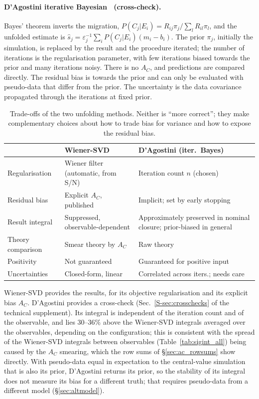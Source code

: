 \documentclass[11pt,a4paper]{article}
\newcommand{\suppref}[2]{#1~\ref{S-#2} of the technical supplement}
\begin{document}
\paragraph{D'Agostini iterative Bayesian~\cite{dagostini} (cross-check).} Bayes' theorem inverts
the migration, $P(C_j|E_i)=R_{ij}\pi_j/\sum_l R_{il}\pi_l$, and the unfolded estimate is
$\hat{s}_j=\varepsilon_j^{-1}\sum_i P(C_j|E_i)(m_i-b_i)$. The prior $\pi_j$, initially the
simulation, is replaced by the result and the procedure iterated; the number of iterations is the
regularisation parameter, with few iterations biased towards the prior and many iterations noisy.
There is no $A_C$, and predictions are compared directly. The residual bias is towards the prior and
can only be evaluated with pseudo-data that differ from the prior. The uncertainty is the data
covariance propagated through the iterations at fixed prior.

\begin{table}[H]\centering\small
\caption{Trade-offs of the two unfolding methods. Neither is ``more correct''; they make
  complementary choices about how to trade bias for variance and how to expose the
  residual bias.}
\label{tab:unfcompare}
\begin{tabular}{L{2.8cm}L{5.4cm}L{6.4cm}}
\toprule
 & \textbf{Wiener-SVD} & \textbf{D'Agostini (iter.\ Bayes)} \\
\midrule
Regularisation    & Wiener filter (automatic, from S/N) & Iteration count $n$ (chosen) \\
Residual bias     & Explicit $A_C$, published           & Implicit; set by early stopping \\
Result integral   & Suppressed, observable-dependent    & Approximately preserved in nominal closure; prior-biased in general \\
Theory comparison & Smear theory by $A_C$               & Raw theory \\
Positivity        & Not guaranteed                      & Guaranteed for positive input \\
Uncertainties     & Closed-form, linear                 & Correlated across iters.; needs care \\
\bottomrule
\end{tabular}
\end{table}

Wiener-SVD provides the results, for its objective regularisation and its explicit bias $A_C$.
D'Agostini provides a cross-check (\suppref{Sec.}{sec:crosschecks}). Its integral is independent
of the iteration count and of the observable, and lies $30$--$36\%$ above the Wiener-SVD integrals
averaged over the observables, depending on the configuration; this is consistent with the spread of the Wiener-SVD integrals
between observables (Table~\ref{tab:sigint_all}) being caused by the $A_C$ smearing, which the row
sums of \S\ref{sec:ac_rowsums} show directly. With pseudo-data equal in expectation to the
central-value simulation that is also its prior, D'Agostini returns its prior, so the
stability of its integral does not measure its bias for a different truth; that requires pseudo-data from a different model (\S\ref{sec:altmodel}).
\end{document}
